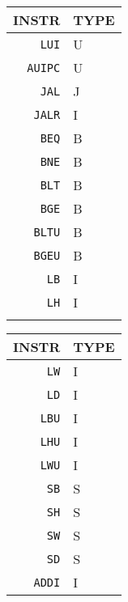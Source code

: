 \begin{table}
    \centering
    \begin{minipage}{.25\linewidth}
        \centering
        \begin{tabular}{r|l}
            \hline
            INSTR          & TYPE \\
            \hline
            \texttt{LUI}   & U    \\
            \texttt{AUIPC} & U    \\
            \hline
            \texttt{JAL}   & J    \\
            \texttt{JALR}  & I    \\
            \hline
            \texttt{BEQ}   & B    \\
            \texttt{BNE}   & B    \\
            \texttt{BLT}   & B    \\
            \texttt{BGE}   & B    \\
            \texttt{BLTU}  & B    \\
            \texttt{BGEU}  & B    \\
            \hline
            \texttt{LB}    & I    \\
            \texttt{LH}    & I    \\ \\
        \end{tabular}
    \end{minipage}%
    \begin{minipage}{.25\linewidth}
        \centering
        \begin{tabular}{r|l}
            \hline
            INSTR          & TYPE \\
            \hline
            \texttt{LW}    & I    \\
            \texttt{LD}    & I    \\
            \texttt{LBU}   & I    \\
            \texttt{LHU}   & I    \\
            \texttt{LWU}   & I    \\
            \hline
            \texttt{SB}    & S    \\
            \texttt{SH}    & S    \\
            \texttt{SW}    & S    \\
            \texttt{SD}    & S    \\
            \hline
            \texttt{ADDI}  & I    \\

\end{tabular}
\end{minipage}
\end{table}
